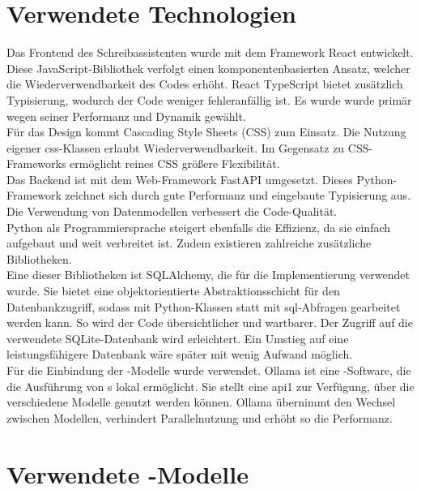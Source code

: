 \documentclass[../main.tex]{subfiles}
\begin{document}
\section{Verwendete Technologien}

Das Frontend des Schreibassistenten wurde mit dem Framework React entwickelt. Diese JavaScript-Bibliothek verfolgt einen komponentenbasierten Ansatz, welcher die Wiederverwendbarkeit 
des Codes erhöht. React TypeScript bietet zusätzlich Typisierung, wodurch der Code weniger fehleranfällig ist. Es wurde wurde primär wegen seiner Performanz und Dynamik gewählt. \cite{react1,react2} \\
Für das Design kommt Cascading Style Sheets (CSS) zum Einsatz. Die Nutzung eigener \acrshort{css}-Klassen erlaubt Wiederverwendbarkeit. Im Gegensatz zu CSS-Frameworks ermöglicht reines CSS größere Flexibilität.\\
Das Backend ist mit dem Web-Framework FastAPI umgesetzt. Dieses Python-Framework zeichnet sich durch gute Performanz und eingebaute Typisierung aus. Die Verwendung von Datenmodellen verbessert die Code-Qualität\cite{fastapi}.\\
Python als Programmiersprache steigert ebenfalls die Effizienz, da sie einfach aufgebaut und weit verbreitet ist. Zudem existieren zahlreiche zusätzliche Bibliotheken.\cite{python}\\
Eine dieser Bibliotheken ist SQLAlchemy, die für die Implementierung verwendet wurde. Sie bietet eine objektorientierte Abstraktionsschicht für den Datenbankzugriff, sodass mit Python-Klassen statt mit \acrshort{sql}-Abfragen gearbeitet werden kann. 
So wird der Code übersichtlicher und wartbarer. Der Zugriff auf die verwendete SQLite-Datenbank wird erleichtert. Ein Umstieg auf eine leistungsfähigere Datenbank wäre später mit wenig Aufwand möglich.\cite{SQLAlchemy}\\
Für die Einbindung der -Modelle wurde  verwendet. Ollama ist eine -Software, die die Ausführung von s lokal ermöglicht. 
Sie stellt eine \acrshort{api1} zur Verfügung, über die verschiedene Modelle genutzt werden können. Ollama übernimmt den Wechsel zwischen Modellen, verhindert Parallelnutzung und erhöht so die Performanz.\cite{ollamaSchreibassi,ollamaTechnologie}



\section{Verwendete -Modelle} \label{sec:kiModelle}
\end{document}
